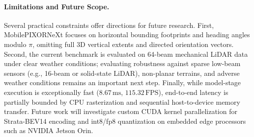 \paragraph{Limitations and Future Scope.}
Several practical constraints offer directions for future research. First, MobilePIXORNeXt focuses on horizontal bounding footprints and heading angles modulo $\pi$, omitting full 3D vertical extents and directed orientation vectors. Second, the current benchmark is evaluated on 64-beam mechanical LiDAR data under clear weather conditions; evaluating robustness against sparse low-beam sensors (e.g., 16-beam or solid-state LiDAR), non-planar terrains, and adverse weather conditions remains an important next step. Finally, while model-stage execution is exceptionally fast ($8.67\,\text{ms}$, $115.32\,\text{FPS}$), end-to-end latency is partially bounded by CPU rasterization and sequential host-to-device memory transfer. Future work will investigate custom CUDA kernel parallelization for Strata-BEV14 encoding and int8/fp8 quantization on embedded edge processors such as NVIDIA Jetson Orin.
